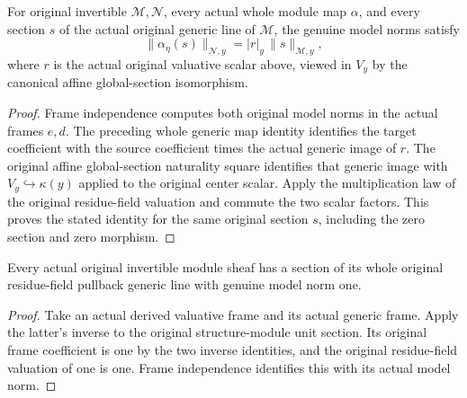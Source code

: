 \begin{lemma}
\label{lem:scheme-line-actual-model-hom-norm}
\leanok
{}
For original invertible $\mathcal M,\mathcal N$, every actual whole
module map $\alpha$, and every section $s$ of the actual original
generic line of $\mathcal M$, the genuine model norms satisfy
\[
 \lVert\alpha_\eta(s)\rVert_{\mathcal N,y}
  =\lvert r\rvert_y\,\lVert s\rVert_{\mathcal M,y},
\]
where $r$ is the actual original valuative scalar above, viewed in
$V_y$ by the canonical affine global-section isomorphism.
\end{lemma}
\begin{proof}
Frame independence computes both original model norms in the actual
frames $e,d$. The preceding whole generic map identity identifies
the target coefficient with the source coefficient times the actual
generic image of $r$. The original affine global-section naturality
square identifies that generic image with $V_y\hookrightarrow\kappa(y)$
applied to the original center scalar. Apply the multiplication law
of the original residue-field valuation and commute the two scalar
factors. This proves the stated identity for the same original
section $s$, including the zero section and zero morphism.
\end{proof}

\begin{lemma}
\label{lem:scheme-line-actual-model-norm-one-section}
\leanok
{}
Every actual original invertible module sheaf has a section of its
whole original residue-field pullback generic line with genuine
model norm one.
\end{lemma}
\begin{proof}
Take an actual derived valuative frame and its actual generic frame.
Apply the latter's inverse to the original structure-module unit
section. Its original frame coefficient is one by the two inverse
identities, and the original residue-field valuation of one is one.
Frame independence identifies this with its actual model norm.
\end{proof}

